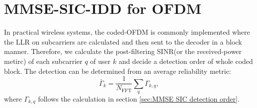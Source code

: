 \section{MMSE-SIC-IDD for OFDM}
In practical wireless systems, the coded-OFDM is commonly implemented where the LLR on subcarriers are calculated and then sent to the decoder in a block manner\cite{csahin2024ofdm}. Therefore, we calculate the post-filtering SINR(or the received-power metirc) of each subcarrier $q$ of user $k$ and decide a detection order of whole coded block. 
The detection can be determined from an average reliability metric:
\begin{equation}
    \bar{\Gamma}_{k}
    =
    \frac{1}{N_{\mathrm{FFT}}}
    \sum_{q}
    \Gamma_{k,q},
    \label{eq:ofdm-average-post-sinr}
\end{equation}
where $\Gamma_{k,q}$ follows the calculation in section \ref{sec:MMSE SIC detection order}.

